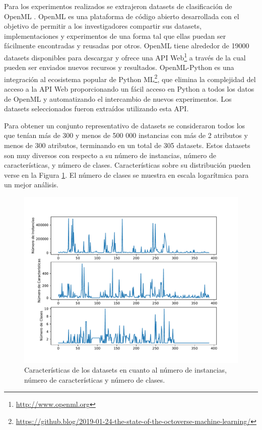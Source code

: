 Para los experimentos realizados se extrajeron datasets de clasificación de OpenML \cite{vanschoren2014openml}. OpenML es una plataforma de código abierto desarrollada con el objetivo de permitir a los investigadores compartir sus datasets, implementaciones y experimentos de una forma tal que ellas puedan ser fácilmente encontradas y reusadas por otros. OpenML tiene alrededor de 19000 datasets disponibles para descargar y ofrece una API Web\footnote{\url{http://www.openml.org}} a través de la cual pueden ser enviados nuevos recursos y resultados. OpenML-Python \cite{feurer2019openmlpy} es una integración al ecosistema popular de Python ML\footnote{\url{https://github.blog/2019-01-24-the-state-of-the-octoverse-machine-learning/}}, que elimina la complejidad del acceso a la API Web proporcionando un fácil acceso en Python a todos los datos de OpenML y automatizando el intercambio de nuevos experimentos. Los datasets seleccionados fueron extraídos utilizando esta API.
 
 Para obtener un conjunto representativo de datasets se consideraron todos los que tenían más de 300  y menos de 500 000 instancias con más de 2 atributos y menos de 300 atributos, terminando en un total de 305 datasets. Estos datasets son muy diversos con respecto a su número de instancias, número de características, y número de clases. Características sobre su distribución pueden verse en la Figura \ref{fig:datasets}. El número de clases se muestra en escala logarítmica para un mejor análisis.
 
 \begin{figure}[H]
\centering
\includegraphics[scale=.73]{Figures/mtf-lineplot.pdf}
\caption{Características de los datasets en cuanto al número de instancias, número de características y número de clases.}
\label{fig:datasets}
\end{figure}
 
